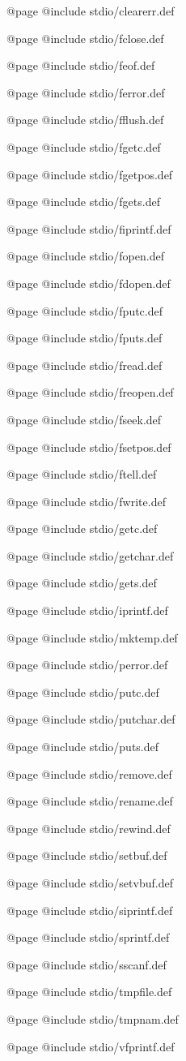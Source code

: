 @page
@include stdio/clearerr.def

@page
@include stdio/fclose.def

@page
@include stdio/feof.def

@page
@include stdio/ferror.def

@page
@include stdio/fflush.def

@page 
@include stdio/fgetc.def 

@page
@include stdio/fgetpos.def

@page 
@include stdio/fgets.def 

@page
@include stdio/fiprintf.def

@page
@include stdio/fopen.def

@page
@include stdio/fdopen.def

@page
@include stdio/fputc.def

@page
@include stdio/fputs.def

@page
@include stdio/fread.def

@page
@include stdio/freopen.def

@page
@include stdio/fseek.def

@page
@include stdio/fsetpos.def

@page
@include stdio/ftell.def

@page
@include stdio/fwrite.def

@page 
@include stdio/getc.def 

@page
@include stdio/getchar.def 

@page 
@include stdio/gets.def

@page
@include stdio/iprintf.def 

@page
@include stdio/mktemp.def

@page
@include stdio/perror.def

@page
@include stdio/putc.def

@page
@include stdio/putchar.def

@page
@include stdio/puts.def

@page
@include stdio/remove.def

@page
@include stdio/rename.def

@page
@include stdio/rewind.def

@page
@include stdio/setbuf.def

@page
@include stdio/setvbuf.def

@page 
@include stdio/siprintf.def 

@page 
@include stdio/sprintf.def 

@page
@include stdio/sscanf.def 

@page
@include stdio/tmpfile.def

@page
@include stdio/tmpnam.def

@page 
@include stdio/vfprintf.def 
